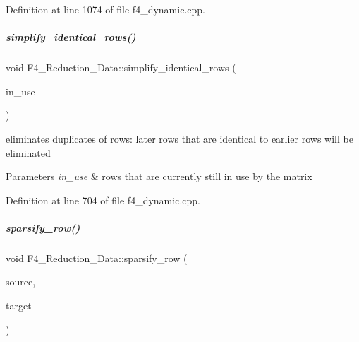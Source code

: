 Definition at line 1074 of file f4\+\_\+dynamic.\+cpp.

\mbox{\label{group___g_b_computation_aa550a298a15a8baac59ced268331dc68}} 
\subparagraph{\texorpdfstring{simplify\+\_\+identical\+\_\+rows()}{simplify\_identical\_rows()}}
{\footnotesize\ttfamily void F4\+\_\+\+Reduction\+\_\+\+Data\+::simplify\+\_\+identical\+\_\+rows (\begin{DoxyParamCaption}\item[{set$<$ unsigned $>$ \&}]{in\+\_\+use }\end{DoxyParamCaption})}



eliminates duplicates of rows\+: later rows that are identical to earlier rows will be eliminated 


\begin{DoxyParams}{Parameters}
{\em in\+\_\+use} & rows that are currently still in use by the matrix \\
\hline
\end{DoxyParams}


Definition at line 704 of file f4\+\_\+dynamic.\+cpp.

\mbox{\label{group___g_b_computation_a9fe5ee5976f0d923576d08d473b5fb0c}} 
\subparagraph{\texorpdfstring{sparsify\+\_\+row()}{sparsify\_row()}\hspace{0.1cm}{\footnotesize\ttfamily [1/2]}}
{\footnotesize\ttfamily void F4\+\_\+\+Reduction\+\_\+\+Data\+::sparsify\+\_\+row (\begin{DoxyParamCaption}\item[{vector$<$ C\+O\+E\+F\+\_\+\+T\+Y\+PE $>$ \&}]{source,  }\item[{vector$<$ pair$<$ unsigned, C\+O\+E\+F\+\_\+\+T\+Y\+PE $>$ $>$ \&}]{target }\end{DoxyParamCaption})\hspace{0.3cm}{\ttfamily [protected]}}



